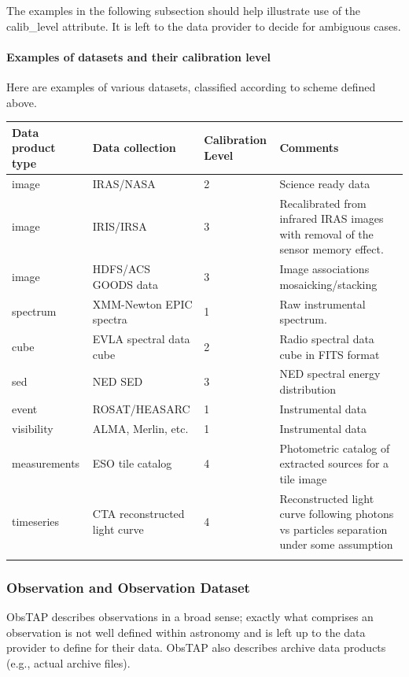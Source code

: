 \documentclass[11pt,a4paper]{ivoa}
\begin{document}
The examples in the following subsection should help illustrate use of the calib\_level attribute. It is left to the
data provider to decide for ambiguous cases.

\paragraph[Examples of datasets and their calibration level]{Examples of datasets and their calibration level}
Here are examples of various datasets, classified according to scheme defined above.

\begin{tabularx}{\textwidth}{|p{}|p{}|p{}|p{}|}
\hline
Data product type & Data collection & Calibration Level & Comments\\\hline
image & IRAS/NASA & 2 & Science ready data\\\hline
image & IRIS/IRSA & 3 & Recalibrated from infrared IRAS images with removal of the sensor memory effect.\\\hline
image & HDFS/ACS GOODS data & 3 & Image associations mosaicking/stacking\\\hline
spectrum & XMM-Newton EPIC spectra & 1 & Raw instrumental spectrum.\\\hline
cube & EVLA spectral data cube & 2 & Radio spectral data cube in FITS format\\\hline
sed & NED SED & 3 & NED spectral energy distribution\\\hline
event & ROSAT/HEASARC & 1 & Instrumental data\\\hline
visibility & ALMA, Merlin, etc. & 1 & Instrumental data\\\hline
measurements & ESO tile catalog  & 4 & Photometric catalog of extracted sources for a tile image\\\hline
timeseries & CTA reconstructed light curve  & 4 & Reconstructed light curve following photons vs particles separation under some assumption \\\hline
\caption{Examples of datasets with their associated calibration level values.}
\label{tab:2}
\end{tabularx}

\subsubsection{Observation and Observation Dataset}
\label{bkm:Ref450327253}ObsTAP describes observations in a broad sense; exactly what comprises an
{\textquotedbl}observation{\textquotedbl} is not well defined within astronomy and is left up to the data provider to
define for their data.  ObsTAP also describes archive data products (e.g., actual archive files).
\end{document}
